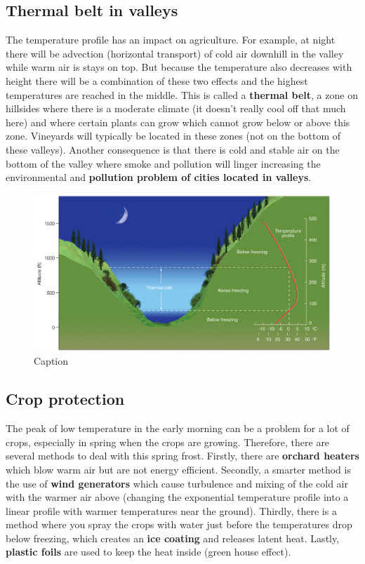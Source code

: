 \documentclass[12pt,oneside]{book}
\begin{document}
\subsection{Thermal belt in valleys}\label{thermal-belt-in-valleys}

The temperature profile has an impact on agriculture. For example, at
night there will be advection (horizontal transport) of cold air
downhill in the valley while warm air is stays on top. But because the
temperature also decreases with height there will be a combination of
these two effects and the highest temperatures are reached in the
middle. This is called a \textbf{thermal belt}, a zone on hillsides
where there is a moderate climate (it doesn't really cool off that much
here) and where certain plants can grow which cannot grow below or above
this zone. Vineyards will typically be located in these zones (not on
the bottom of these valleys). Another consequence is that there is cold
and stable air on the bottom of the valley where smoke and pollution
will linger increasing the environmental and \textbf{pollution problem
of cities located in valleys}.

\begin{figure}

{\centering \includegraphics[width=0.8\linewidth]{figures/Figure216} 

}

\caption{Caption}\label{fig:ThermalBelt}
\end{figure}

\subsection{Crop protection}\label{crop-protection}

The peak of low temperature in the early morning can be a problem for a
lot of crops, especially in spring when the crops are growing.
Therefore, there are several methods to deal with this spring frost.
Firstly, there are \textbf{orchard heaters} which blow warm air but are
not energy efficient. Secondly, a smarter method is the use of
\textbf{wind generators} which cause turbulence and mixing of the cold
air with the warmer air above (changing the exponential temperature
profile into a linear profile with warmer temperatures near the ground).
Thirdly, there is a method where you spray the crops with water just
before the temperatures drop below freezing, which creates an
\textbf{ice coating} and releases latent heat. Lastly, \textbf{plastic
foils} are used to keep the heat inside (green house effect).
\end{document}

